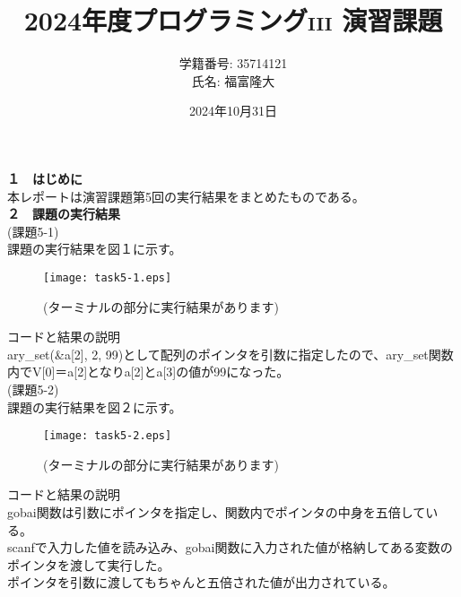 \documentclass[a4j]{jsarticle}
\title{2024年度プログラミング\textsc{iii} 演習課題}
\author{学籍番号: 35714121 \\ 氏名: 福富隆大}
\date{2024年10月31日}
\begin{document}
\maketitle

\textbf{１　はじめに} \\

本レポートは演習課題第5回の実行結果をまとめたものである。\\

\textbf{２　課題の実行結果} \\

\textmd{(課題5-1)} \\

課題の実行結果を図１に示す。 \\

\begin{figure}[htbp]
  \centering 
  \texttt{[image: task5-1.eps]}
  \caption{(ターミナルの部分に実行結果があります)}
  \label{fig:sample}
\end{figure}

\textmd{コードと結果の説明} \\
ary\_set(\&a[2], 2, 99)として配列のポインタを引数に指定したので、ary\_set関数内でV[0]＝a[2]となりa[2]とa[3]の値が99になった。\\

\textmd{(課題5-2)} \\

課題の実行結果を図２に示す。\\

\begin{figure}[htbp]
  \centering
  \texttt{[image: task5-2.eps]}
  \caption{(ターミナルの部分に実行結果があります)}
  \label{fig:sample}
\end{figure}

\textmd{コードと結果の説明} \\
gobai関数は引数にポインタを指定し、関数内でポインタの中身を五倍している。\\
scanfで入力した値を読み込み、gobai関数に入力された値が格納してある変数のポインタを渡して実行した。\\
ポインタを引数に渡してもちゃんと五倍された値が出力されている。\\
\end{document}
